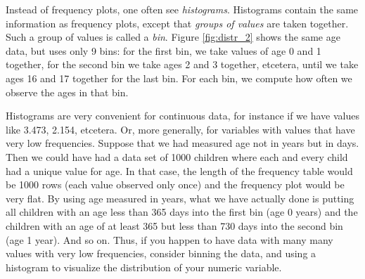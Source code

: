 
Instead of frequency plots, one often see \textit{histograms}. Histograms contain the same information as frequency plots, except that \textit{groups of values} are taken together. Such a group of values is called a \textit{bin}. Figure \ref{fig:distr_2} shows the same age data, but uses only 9 bins: for the first bin, we take values of age 0 and 1 together, for the second bin we take ages 2 and 3 together, etcetera, until we take ages 16 and 17 together for the last bin. For each bin, we compute how often we observe the ages in that bin.

Histograms are very convenient for continuous data, for instance if we have values like 3.473, 2.154, etcetera. Or, more generally, for variables with values that have very low frequencies. Suppose that we had measured age not in years but in days. Then we could have had a data set of 1000 children where each and every child had a unique value for age. In that case, the length of the frequency table would be 1000 rows (each value observed only once) and the frequency plot would be very flat. By using age measured in years, what we have actually done is putting all children with an age less than 365 days into the first bin (age 0 years) and the children with an age of at least 365 but less than 730 days into the second bin (age 1 year). And so on. Thus, if you happen to have data with many many values with very low frequencies, consider binning the data, and using a histogram to visualize the distribution of your numeric variable.



\begin{knitrout}
\color{fgcolor}\begin{kframe}


{\ttfamily\noindent\bfseries{}}\end{kframe}
\end{knitrout}



